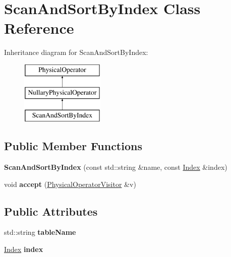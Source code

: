 \hypertarget{class_scan_and_sort_by_index}{\section{Scan\+And\+Sort\+By\+Index Class Reference}
\label{class_scan_and_sort_by_index}
}
Inheritance diagram for Scan\+And\+Sort\+By\+Index\+:\begin{figure}[H]
\begin{center}
\leavevmode
\includegraphics[height=3.000000cm]{class_scan_and_sort_by_index}
\end{center}
\end{figure}
\subsection*{Public Member Functions}
\begin{DoxyCompactItemize}
\item 
\hypertarget{class_scan_and_sort_by_index_a8304f98fd2eea171365ad996666fdd01}{{\bfseries Scan\+And\+Sort\+By\+Index} (const std\+::string \&name, const \hyperlink{class_index}{Index} \&index)}\label{class_scan_and_sort_by_index_a8304f98fd2eea171365ad996666fdd01}

\item 
\hypertarget{class_scan_and_sort_by_index_a9e0d99d88104c8215bacb470e298b363}{void {\bfseries accept} (\hyperlink{class_physical_operator_visitor}{Physical\+Operator\+Visitor} \&v)}\label{class_scan_and_sort_by_index_a9e0d99d88104c8215bacb470e298b363}

\end{DoxyCompactItemize}
\subsection*{Public Attributes}
\begin{DoxyCompactItemize}
\item 
\hypertarget{class_scan_and_sort_by_index_a04ad43495fcb141d4e7c51d9907f3a42}{std\+::string {\bfseries table\+Name}}\label{class_scan_and_sort_by_index_a04ad43495fcb141d4e7c51d9907f3a42}

\item 
\hypertarget{class_scan_and_sort_by_index_a132a795383838f5cc3e6c17288509e15}{\hyperlink{class_index}{Index} {\bfseries index}}\label{class_scan_and_sort_by_index_a132a795383838f5cc3e6c17288509e15}

\end{DoxyCompactItemize}


